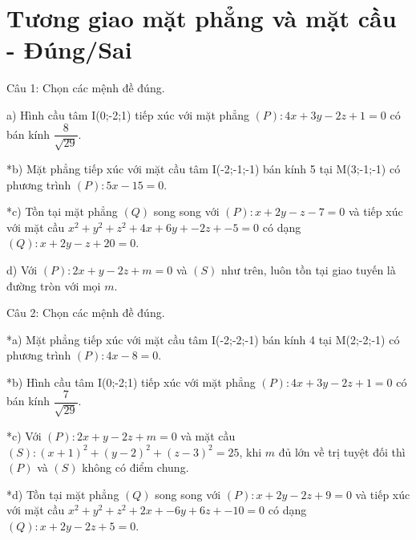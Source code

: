 \documentclass[a4paper,12pt]{article}
\begin{document}
\section*{Tương giao mặt phẳng và mặt cầu - Đúng/Sai}

Câu 1: Chọn các mệnh đề đúng.

a) Hình cầu tâm I(0;-2;1) tiếp xúc với mặt phẳng $(P): 4x + 3y - 2z + 1 = 0$ có bán kính $\dfrac{8}{\sqrt{29}}$.

*b) Mặt phẳng tiếp xúc với mặt cầu tâm I(-2;-1;-1) bán kính 5 tại M(3;-1;-1) có phương trình $(P): 5x -15 = 0$.

*c) Tồn tại mặt phẳng $(Q)$ song song với $(P): x + 2y - z -7 = 0$ và tiếp xúc với mặt cầu $x^2+y^2+z^2+4x+6y+-2z+-5=0$ có dạng $(Q): x + 2y - z + 20 = 0$.

d) Với $(P): 2x+y-2z+m=0$ và $(S)$ như trên, luôn tồn tại giao tuyến là đường tròn với mọi $m$.



Câu 2: Chọn các mệnh đề đúng.

*a) Mặt phẳng tiếp xúc với mặt cầu tâm I(-2;-2;-1) bán kính 4 tại M(2;-2;-1) có phương trình $(P): 4x -8 = 0$.

*b) Hình cầu tâm I(0;-2;1) tiếp xúc với mặt phẳng $(P): 4x + 3y - 2z + 1 = 0$ có bán kính $\dfrac{7}{\sqrt{29}}$.

*c) Với $(P): 2x+y-2z+m=0$ và mặt cầu $(S): (x+1)^2+(y-2)^2+(z-3)^2=25$, khi $m$ đủ lớn về trị tuyệt đối thì $(P)$ và $(S)$ không có điểm chung.

*d) Tồn tại mặt phẳng $(Q)$ song song với $(P): x + 2y - 2z + 9 = 0$ và tiếp xúc với mặt cầu $x^2+y^2+z^2+2x+-6y+6z+-10=0$ có dạng $(Q): x + 2y - 2z + 5 = 0$.
\end{document}
